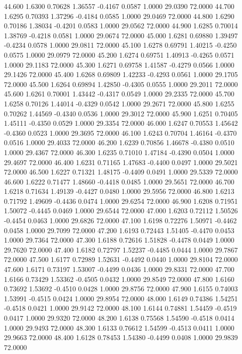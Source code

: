   44.600   1.6300   0.70628   1.36557  -0.4167   0.0587   1.0000  29.0390  72.0000
  44.700   1.6295   0.70393   1.37296  -0.4184   0.0585   1.0000  29.0469  72.0000
  44.800   1.6290   0.70186   1.38034  -0.4201   0.0583   1.0000  29.0562  72.0000
  44.900   1.6285   0.70014   1.38769  -0.4218   0.0581   1.0000  29.0674  72.0000
  45.000   1.6281   0.69880   1.39497  -0.4234   0.0578   1.0000  29.0811  72.0000
  45.100   1.6278   0.69791   1.40215  -0.4250   0.0575   1.0000  29.0979  72.0000
  45.200   1.6274   0.69751   1.40913  -0.4265   0.0571   1.0000  29.1183  72.0000
  45.300   1.6271   0.69758   1.41587  -0.4279   0.0566   1.0000  29.1426  72.0000
  45.400   1.6268   0.69809   1.42233  -0.4293   0.0561   1.0000  29.1705  72.0000
  45.500   1.6264   0.69894   1.42850  -0.4305   0.0555   1.0000  29.2011  72.0000
  45.600   1.6261   0.70001   1.43442  -0.4317   0.0549   1.0000  29.2335  72.0000
  45.700   1.6258   0.70126   1.44014  -0.4329   0.0542   1.0000  29.2671  72.0000
  45.800   1.6255   0.70262   1.44569  -0.4340   0.0536   1.0000  29.3012  72.0000
  45.900   1.6251   0.70405   1.45111  -0.4350   0.0529   1.0000  29.3354  72.0000
  46.000   1.6247   0.70553   1.45642  -0.4360   0.0523   1.0000  29.3695  72.0000
  46.100   1.6243   0.70704   1.46164  -0.4370   0.0516   1.0000  29.4033  72.0000
  46.200   1.6239   0.70856   1.46678  -0.4380   0.0510   1.0000  29.4367  72.0000
  46.300   1.6235   0.71010   1.47184  -0.4390   0.0504   1.0000  29.4697  72.0000
  46.400   1.6231   0.71165   1.47683  -0.4400   0.0497   1.0000  29.5021  72.0000
  46.500   1.6227   0.71321   1.48175  -0.4409   0.0491   1.0000  29.5339  72.0000
  46.600   1.6222   0.71477   1.48660  -0.4418   0.0485   1.0000  29.5651  72.0000
  46.700   1.6218   0.71634   1.49139  -0.4427   0.0480   1.0000  29.5956  72.0000
  46.800   1.6213   0.71792   1.49609  -0.4436   0.0474   1.0000  29.6254  72.0000
  46.900   1.6208   0.71951   1.50072  -0.4445   0.0469   1.0000  29.6544  72.0000
  47.000   1.6203   0.72112   1.50526  -0.4454   0.0463   1.0000  29.6826  72.0000
  47.100   1.6198   0.72276   1.50971  -0.4462   0.0458   1.0000  29.7099  72.0000
  47.200   1.6193   0.72443   1.51405  -0.4470   0.0453   1.0000  29.7364  72.0000
  47.300   1.6188   0.72616   1.51828  -0.4478   0.0449   1.0000  29.7620  72.0000
  47.400   1.6182   0.72797   1.52237  -0.4485   0.0444   1.0000  29.7867  72.0000
  47.500   1.6177   0.72989   1.52631  -0.4492   0.0440   1.0000  29.8104  72.0000
  47.600   1.6171   0.73197   1.53007  -0.4499   0.0436   1.0000  29.8331  72.0000
  47.700   1.6166   0.73429   1.53362  -0.4505   0.0432   1.0000  29.8549  72.0000
  47.800   1.6160   0.73692   1.53692  -0.4510   0.0428   1.0000  29.8756  72.0000
  47.900   1.6155   0.74003   1.53991  -0.4515   0.0424   1.0000  29.8954  72.0000
  48.000   1.6149   0.74386   1.54251  -0.4518   0.0421   1.0000  29.9142  72.0000
  48.100   1.6144   0.74881   1.54459  -0.4519   0.0417   1.0000  29.9320  72.0000
  48.200   1.6138   0.75568   1.54590  -0.4518   0.0414   1.0000  29.9493  72.0000
  48.300   1.6133   0.76612   1.54599  -0.4513   0.0411   1.0000  29.9663  72.0000
  48.400   1.6128   0.78453   1.54380  -0.4499   0.0408   1.0000  29.9839  72.0000
